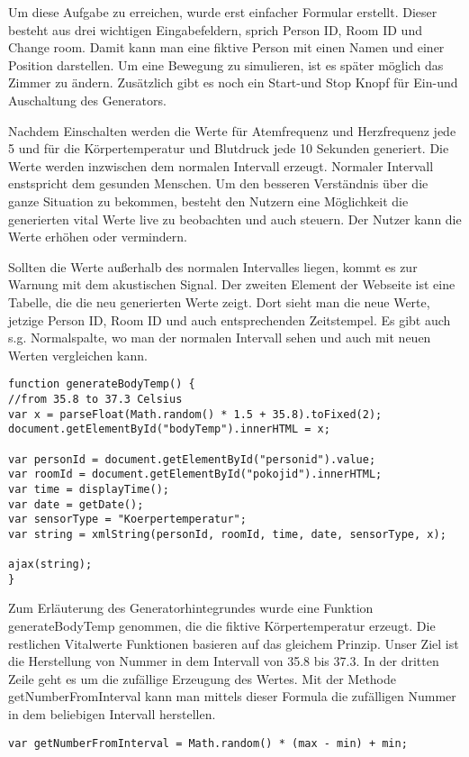 Um diese Aufgabe zu erreichen, wurde erst einfacher Formular erstellt.
Dieser besteht aus drei wichtigen Eingabefeldern, sprich Person ID, Room ID und Change room. Damit kann man eine fiktive Person mit einen Namen und einer Position darstellen. Um eine Bewegung zu simulieren, ist es später möglich das Zimmer zu ändern. Zusätzlich gibt es noch ein Start-und Stop Knopf für Ein-und Auschaltung des Generators.
 
Nachdem Einschalten werden die Werte für Atemfrequenz und Herzfrequenz jede 5 und für die Körpertemperatur und Blutdruck jede 10 Sekunden generiert. Die Werte werden inzwischen dem normalen Intervall erzeugt. Normaler Intervall enstspricht dem gesunden Menschen. Um den besseren Verständnis über die ganze Situation zu bekommen, besteht den Nutzern eine Möglichkeit die generierten vital Werte live zu beobachten und auch steuern. Der Nutzer kann die Werte erhöhen oder vermindern.

Sollten die Werte außerhalb des normalen Intervalles liegen, kommt es zur Warnung mit dem akustischen Signal. 
Der zweiten Element der Webseite ist eine Tabelle, die die neu generierten Werte zeigt. Dort sieht man die neue Werte, jetzige Person ID, Room ID und auch entsprechenden Zeitstempel. Es gibt auch s.g. Normalspalte, wo man der normalen Intervall sehen und auch mit neuen Werten vergleichen kann.
\\
\begin{lstlisting}
function generateBodyTemp() {
//from 35.8 to 37.3 Celsius
var x = parseFloat(Math.random() * 1.5 + 35.8).toFixed(2);
document.getElementById("bodyTemp").innerHTML = x;

var personId = document.getElementById("personid").value;
var roomId = document.getElementById("pokojid").innerHTML;
var time = displayTime();
var date = getDate();
var sensorType = "Koerpertemperatur"; 
var string = xmlString(personId, roomId, time, date, sensorType, x);

ajax(string);    
}
\end{lstlisting}

Zum Erläuterung des Generatorhintegrundes wurde eine Funktion generateBodyTemp genommen, die die fiktive Körpertemperatur erzeugt. Die restlichen Vitalwerte Funktionen basieren auf das gleichem Prinzip. Unser Ziel ist die Herstellung von Nummer in dem Intervall von 35.8 bis 37.3. In der dritten Zeile geht es um die zufällige Erzeugung des Wertes. Mit der Methode getNumberFromInterval kann man mittels dieser Formula die zufälligen Nummer in dem beliebigen Intervall herstellen. 
\begin{lstlisting}
var getNumberFromInterval = Math.random() * (max - min) + min;
\end{lstlisting}

